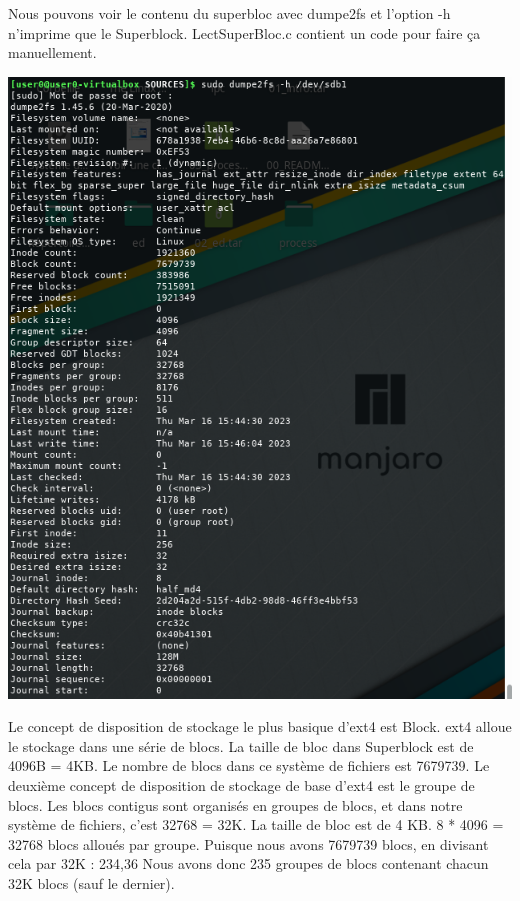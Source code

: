 \documentclass[12pt, letterpaper]{report}
\begin{document}
Nous pouvons voir le contenu du superbloc avec dumpe2fs et l'option -h n'imprime que le Superblock. LectSuperBloc.c contient un code pour faire ça manuellement.
\begin{center}
	\includegraphics[width=\textwidth]{dumpsuperbloc}
\end{center}


\justifying
Le concept de disposition de stockage le plus basique d'ext4 est Block. ext4 alloue le stockage dans une série de blocs. La taille de bloc dans Superblock est de 4096B = 4KB. Le nombre de blocs dans ce système de fichiers est 7679739. \newline
Le deuxième concept de disposition de stockage de base d'ext4 est le groupe de blocs. Les blocs contigus sont organisés en groupes de blocs, et dans notre système de fichiers, c'est 32768 = 32K.\newline
La taille de bloc est de 4 KB. 8 * 4096 = 32768 blocs alloués par groupe.\newline
Puisque nous avons 7679739 blocs, en divisant cela par 32K : 234,36
Nous avons donc 235 groupes de blocs contenant chacun 32K blocs (sauf le dernier).
\end{document}
